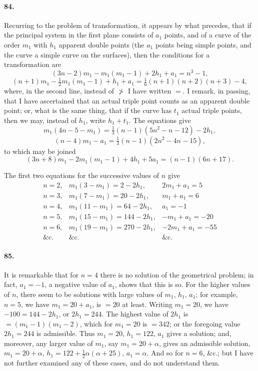\documentclass[11pt]{article}
\begin{document}
\medskip

\paragraph{84.}
Recurring to the problem of transformation, it appears by what
precedes, that if the principal system in the first plane consists of
$a_{1}$ points, and of a curve of the order $m_{1}$ with $h_{1}$
apparent double points (the $a_{1}$ points being simple points, and the
curve a simple curve on the surfaces), then the conditions for a
transformation are
\[
(3n-2)m_{1}-m_{1}(m_{1}-1)+2h_{1}+a_{1} = n^{3}-1,
\]
\[
(n+1)m_{1}-\tfrac{1}{2}m_{1}(m_{1}-1)+h_{1}+a_{1}
= \tfrac{1}{6}(n+1)(n+2)(n+3)-4,
\]
where, in the second line, instead of $\not>$ I have written $=$. I
remark, in passing, that I have ascertained that an actual triple point
counts as an apparent double point; or, what is the same thing, that if
the curve has $t_{1}$ actual triple points, then we may, instead of
$h_{1}$, write $h_{1}+t_{1}$. The equations give
\[
m_{1}(4n-5-m_{1}) = \tfrac{1}{3}(n-1)(5n^{2}-n-12)-2h_{1},
\]
\[
(n-4)m_{1}-a_{1} = \tfrac{1}{3}(n-1)(2n^{2}-4n-15),
\]
to which may be joined
\[
(3n+8)m_{1}-2m_{1}(m_{1}-1)+4h_{1}+5a_{1} = (n-1)(6n+17).
\]

\medskip

The first two equations for the successive values of $n$ give
\[
\begin{array}{lll}
n=2, & m_{1}(3-m_{1})=2-2h_{1}, & 2m_{1}+a_{1}=5\\
n=3, & m_{1}(7-m_{1})=20-2h_{1}, & m_{1}+a_{1}=6\\
n=4, & m_{1}(11-m_{1})=64-2h_{1}, & a_{1}=-1\\
n=5, & m_{1}(15-m_{1})=144-2h_{1}, & -m_{1}+a_{1}=-20\\
n=6, & m_{1}(19-m_{1})=270-2h_{1}, & -2m_{1}+a_{1}=-55\\
\&\mathrm{c.} & \&\mathrm{c.} & \&\mathrm{c.}
\end{array}
\]

\medskip

\paragraph{85.}
It is remarkable that for $n=4$ there is no solution of the geometrical
problem; in fact, $a_{1}=-1$, a negative value of $a_{1}$, shows that
this is so. For the higher values of $n$, there seem to be solutions
with large values of $m_{1}$, $h_{1}$, $a_{1}$; for example, $n=5$, we
have $m_{1}=20+a_{1}$, is $=20$ at least. Writing $m_{1}=20$, we have
$-100=144-2h_{1}$, or $2h_{1}=244$. The highest value of $2h_{1}$ is
$=(m_{1}-1)(m_{1}-2)$, which for $m_{1}=20$ is $=342$; or the foregoing
value $2h_{1}=244$ is admissible. Thus $m_{1}=20$, $h_{1}=122$, $a_{1}$
gives a solution; and, moreover, any larger value of $m_{1}$, say
$m_{1}=20+\alpha$, gives an admissible solution, $m_{1}=20+\alpha$,
$h_{1}=122+\tfrac{1}{2}\alpha(\alpha+25)$, $a_{1}=\alpha$. And so for
$n=6$, \&c.; but I have not further examined any of these cases, and do
not understand them.
\end{document}
